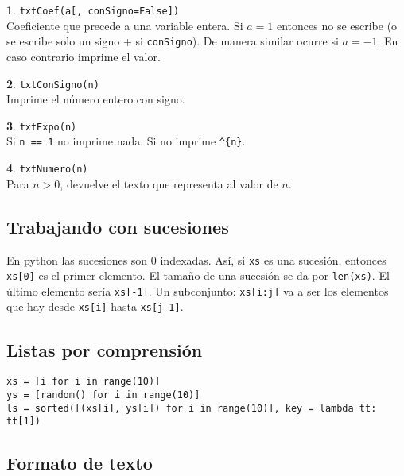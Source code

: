 \documentclass[12pt]{article}
\theoremstyle{definition}
\newtheorem{funcion}{}[section]
\begin{document}
\begin{funcion}
  \verb|txtCoef(a[, conSigno=False])| \\[1ex]
  Coeficiente que precede a una variable entera. Si $a=1$ entonces no se escribe (o se escribe solo un signo + si \verb|conSigno|). De manera similar ocurre si $a=-1$. En caso contrario imprime el valor.
\end{funcion}

\begin{funcion}
  \verb|txtConSigno(n)| \\[1ex]
  Imprime el n\'umero entero con signo.
\end{funcion}

\begin{funcion}
  \verb|txtExpo(n)| \\[1ex]
  Si \verb|n == 1| no imprime nada. Si no imprime \verb|^{n}|.
\end{funcion}

\begin{funcion}
  \verb|txtNumero(n)| \\[1ex]
  Para $n > 0$, devuelve el texto que representa al valor de $n$.
\end{funcion}

\subsection{Trabajando con sucesiones}

En python las sucesiones son 0 indexadas. As\'i, si \verb|xs| es una sucesi\'on, entonces \verb|xs[0]| es el primer elemento. El tama\~no de una sucesi\'on se da por \verb|len(xs)|. El \'ultimo elemento ser\'ia \verb|xs[-1]|. Un subconjunto: \verb|xs[i:j]| va a ser los elementos que hay desde \verb|xs[i]| hasta \verb|xs[j-1]|.

\subsection{Listas por comprensi\'on}
\begin{verbatim}
xs = [i for i in range(10)]
ys = [random() for i in range(10)]
ls = sorted([(xs[i], ys[i]) for i in range(10)], key = lambda tt: tt[1])
\end{verbatim}

\subsection{Formato de texto}
\end{document}
